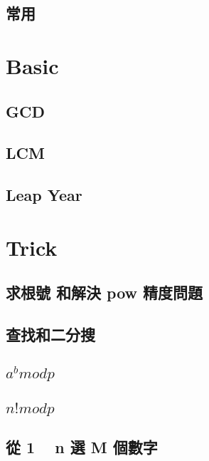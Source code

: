     \subsection{常用}
        


\section{Basic}
    \subsection{GCD}
        
    \subsection{LCM}
        
    \subsection{Leap Year}
        


\section{Trick}
    \subsection{求根號 和解決 pow 精度問題}
        
    \subsection{查找和二分搜}
        
    \subsection{$a^b mod p$}
         
    \subsection{$n! mod p$}
         
    \subsection{從 1 ~ n 選 M 個數字}
        
